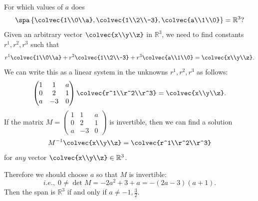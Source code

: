 \begin{example}
For which values of $a$ does
\[
\spa \left\{ \colvec{1\\0\\a} , \colvec{1\\2\\-3} , \colvec{a\\1\\0}   \right\} = \mathbb{R}^3?
\]
Given an arbitrary vector $\colvec{x\\y\\z}$ in $\mathbb{R}^3$, we need to find constants $r^1, r^2, r^3$ such that
\[
r^1 \colvec{1\\0\\a} + r^2\colvec{1\\2\\-3} +r^3 \colvec{a\\1\\0} = \colvec{x\\y\\z}.
\]
We can write this as a linear system in the unknowns $r^1, r^2, r^3$ as follows:
\[
\begin{pmatrix}
1 & 1 & a \\ 
0 & 2 & 1 \\
a & -3 & 0
\end{pmatrix}
\colvec{r^1\\r^2\\r^3}
= \colvec{x\\y\\z}.
\]
If the matrix $M=\begin{pmatrix}
1 & 1 & a \\ 
0 & 2 & 1 \\
a & -3 & 0
\end{pmatrix}$ is invertible, then we can find a solution 
\[
M^{-1}\colvec{x\\y\\z}=\colvec{r^1\\r^2\\r^3}
\]
for \emph{any} vector $\colvec{x\\y\\z} \in \mathbb{R}^3$.

Therefore we should choose $a$ so that $M$ is invertible:  
\[
i.e.,\;  0 \neq \det M = -2a^2 + 3 + a = -(2a-3)(a+1). 
\]
Then the span is $\mathbb{R}^3$ if and only if $a \neq -1, \frac{3}{2}$.
\end{example}


